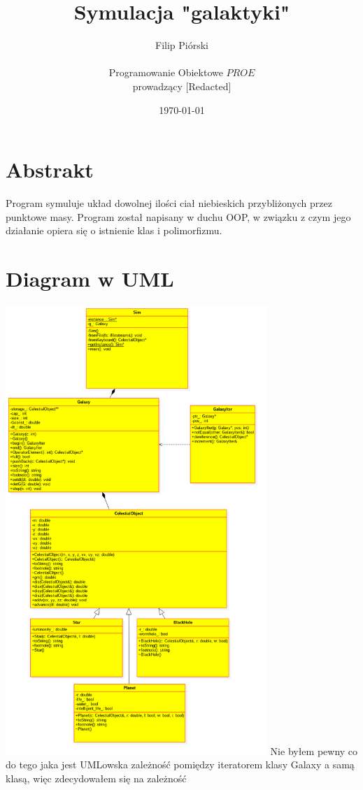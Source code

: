 \documentclass{article}
\title{Symulacja "galaktyki"}
\author{Filip Piórski\\ [Redacted]\\Programowanie Obiektowe \(PROE\)\\prowadzący [Redacted]}
\date{\today}
\begin{document}
\maketitle
\vspace{1cm}

\section{Abstrakt}
Program symuluje układ dowolnej ilości ciał niebieskich przybliżonych przez punktowe masy. Program został napisany w duchu OOP, w związku z czym jego działanie opiera się o istnienie klas i polimorfizmu.
\newpage
\section{Diagram w UML}
\begin{center}
\vspace{5mm}
\includegraphics[height=17cm]{UML}
Nie byłem pewny co do tego jaka jest UMLowska zależność pomiędzy iteratorem klasy Galaxy a samą klasą, więc zdecydowałem się na zależność
\newpage


\end{center}
\end{document}

